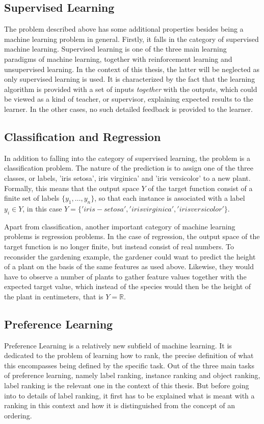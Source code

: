 \subsection{Supervised Learning}
The problem described above has some additional properties besides being a machine learning problem in general. Firstly, it falls in the category of supervised machine learning. Supervised learning is one of the three main learning paradigms of machine learning, together with reinforcement learning and unsupervised learning. In the context of this thesis, the latter will be neglected as only supervised learning is used. It is characterized by the fact that the learning algorithm is provided with a set of inputs \textit{together} with the outputs, which could be viewed as a kind of teacher, or supervisor, explaining expected results to the learner. In the other cases, no such detailed feedback is provided to the learner. 

\subsection{Classification and Regression}
In addition to falling into the category of supervised learning, the problem is a classification problem. The nature of the prediction is to assign one of the three classes, or labels, 'iris setosa', iris virginica' and 'iris versicolor' to a new plant. Formally, this means that the output space $Y$ of the target function consist of a finite set of labels $\lbrace y_1,\dots,y_n\rbrace$, so that each instance is associated with a label $y_i \in Y$, in this case $Y=\lbrace 'iris-setosa','iris virginica', 'iris versicolor' \rbrace $. 

Apart from classification, another important category of machine learning problems is regression problems. In the case of regression, the output space of the target function is no longer finite, but instead consist of real numbers. To reconsider the gardening example, the gardener could want to predict the height of a plant on the basis of the same features as used above. Likewise, they would have to observe a number of plants to gather feature values together with the expected target value, which instead of the species would then be the height of the plant in centimeters, that is $Y=\mathbb{R}$.

\subsection{Preference Learning}
Preference Learning is a relatively new subfield of machine learning\cite{DBLP:books/daglib/0025729}. It is dedicated to the problem of learning how to rank, the precise definition of what this encompasses being defined by the specific task. Out of the three main tasks of preference learning, namely label ranking, instance ranking and object ranking, label ranking is the relevant one in the context of this thesis. But before going into to details of label ranking, it first has to be explained what is meant with a ranking in this context and how it is distinguished from the concept of an ordering.

